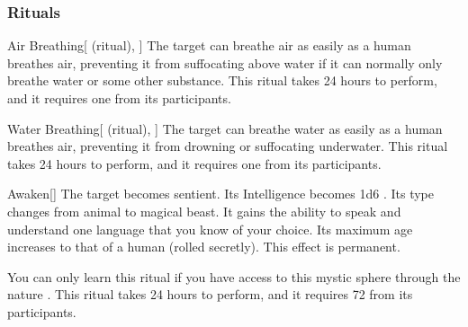 \subsubsection{Rituals}


\lowercase{\hypertarget{spell:Air Breathing}{}}\label{spell:Air Breathing}
\begin{attuneability}[Rank 3]{\hypertarget{spell:Air Breathing}{Air Breathing}}[ (ritual), ]
The target can breathe air as easily as a human breathes air, preventing it from suffocating above water if it can normally only breathe water or some other substance.
This ritual takes 24 hours to perform, and it requires one  from its participants.
\end{attuneability}
\vspace{0.25em}



\lowercase{\hypertarget{spell:Water Breathing}{}}\label{spell:Water Breathing}
\begin{attuneability}[Rank 3]{\hypertarget{spell:Water Breathing}{Water Breathing}}[ (ritual), ]
The target can breathe water as easily as a human breathes air, preventing it from drowning or suffocating underwater.
This ritual takes 24 hours to perform, and it requires one  from its participants.
\end{attuneability}
\vspace{0.25em}



\lowercase{\hypertarget{spell:Awaken}{}}\label{spell:Awaken}
\begin{freeability}[Rank 6]{\hypertarget{spell:Awaken}{Awaken}}[]
The target becomes sentient.
Its Intelligence becomes 1d6 .
Its type changes from animal to magical beast.
It gains the ability to speak and understand one language that you know of your choice.
Its maximum age increases to that of a human (rolled secretly).
This effect is permanent.

You can only learn this ritual if you have access to this mystic sphere through the nature .
This ritual takes 24 hours to perform, and it requires 72  from its participants.
\end{freeability}
\vspace{0.25em}


